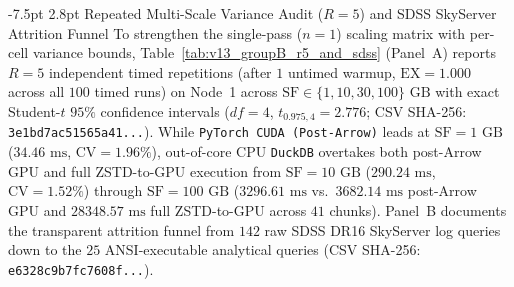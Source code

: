 \documentclass[10pt,a4paper]{article}
\makeatletter
\renewcommand\subsection{\@startsection{subsection}{2}{\z@}%
  {-7.5pt \@plus -2pt \@minus -1pt}%
  {2.8pt \@plus 1pt}%
  {\normalfont\normalsize\bfseries}}
\makeatother
\begin{document}
\subsection{Repeated Multi-Scale Variance Audit ($R=5$) and SDSS SkyServer Attrition Funnel}
\label{subsec:v13_groupB_r5_sdss}
To strengthen the single-pass ($n=1$) scaling matrix with per-cell variance bounds, Table~\ref{tab:v13_groupB_r5_and_sdss} (Panel~A) reports $R=5$ independent timed repetitions (after $1$ untimed warmup, $\text{EX}=1.000$ across all $100$ timed runs) on Node~1 across $\text{SF}\in\{1,10,30,100\}\text{ GB}$ with exact Student-$t$ $95\%$ confidence intervals ($df=4$, $t_{0.975,4}=2.776$; CSV SHA-256: \texttt{3e1bd7ac51565a41...}). While \texttt{PyTorch CUDA (Post-Arrow)} leads at $\text{SF}=1\text{ GB}$ ($34.46\text{ ms}$, $\text{CV}=1.96\%$), out-of-core CPU \texttt{DuckDB} overtakes both post-Arrow GPU and full ZSTD-to-GPU execution from $\text{SF}=10\text{ GB}$ ($290.24\text{ ms}$, $\text{CV}=1.52\%$) through $\text{SF}=100\text{ GB}$ ($3296.61\text{ ms}$ vs.\ $3682.14\text{ ms}$ post-Arrow GPU and $28348.57\text{ ms}$ full ZSTD-to-GPU across $41$ chunks). Panel~B documents the transparent attrition funnel from $142$ raw SDSS DR16 SkyServer log queries down to the $25$ ANSI-executable analytical queries (CSV SHA-256: \texttt{e6328c9b7fc7608f...}).
\end{document}
